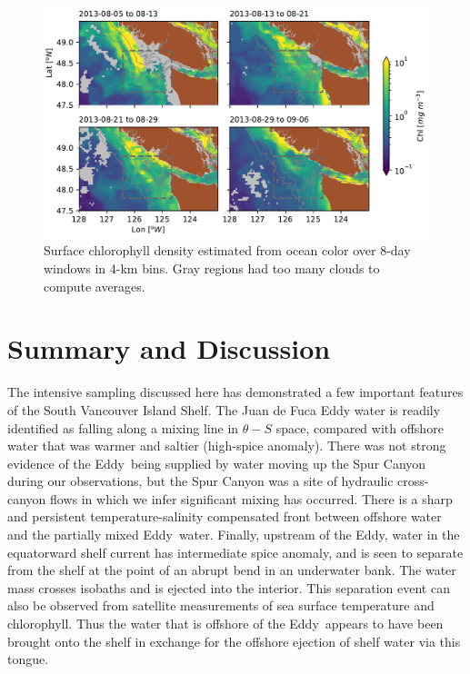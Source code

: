 \documentclass[draft]{agujournal2019}
\newcommand*{\Eddy}{{\sc Eddy}}
\begin{document}
\begin{figure}[htbp]
  \begin{center}
    \includegraphics[width=6.2in]{ChlA}
    \caption{Surface chlorophyll density estimated from ocean color \cite{Huetal12,MODISChlL3} over 8-day windows in 4-km bins. Gray regions had too many clouds to compute averages.
      \label{fig:ChlA} }
  \end{center}
\end{figure}


\section{Summary and Discussion}
\label{sec:Summary}

The intensive sampling discussed here has demonstrated a few important features of the South Vancouver Island Shelf.  The Juan de Fuca Eddy water is readily identified as falling along a mixing line in $\theta-S$ space, compared with offshore water that was warmer and saltier (high-spice anomaly).   There was not strong evidence of the \Eddy\ being supplied by water moving up the Spur Canyon during our observations, but the Spur Canyon was a site of hydraulic cross-canyon flows in which we infer significant mixing has occurred. There is a sharp and persistent temperature-salinity compensated front between offshore water and the partially mixed \Eddy\ water.  Finally, upstream of the \Eddy, water in the equatorward shelf current has intermediate spice anomaly, and is seen to separate from the shelf at the point of an abrupt bend in an underwater bank.  The water mass crosses isobaths and is ejected into the interior. This separation event can also be observed from satellite measurements of sea surface temperature and chlorophyll.  Thus the water that is offshore of the \Eddy\ appears to have been brought onto the shelf in exchange for the offshore ejection of shelf water via this tongue.
\end{document}
